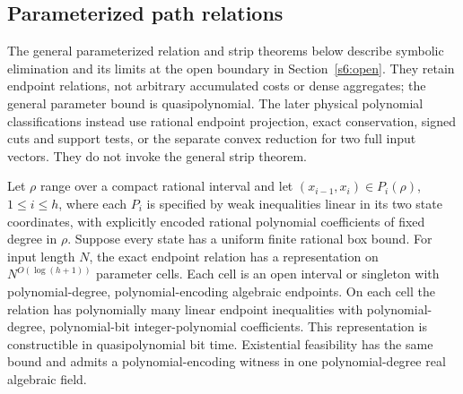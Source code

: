\subsection{Parameterized path relations}\label{s5:parameter-paths}

The general parameterized relation and strip theorems below describe
symbolic elimination and its limits at the open boundary in
Section~\ref{s6:open}. They retain endpoint relations, not arbitrary
accumulated costs or dense aggregates; the general parameter bound is
quasipolynomial. The later physical polynomial classifications instead
use rational endpoint projection, exact conservation, signed cuts and
support tests, or the separate convex reduction for two full input
vectors. They do not invoke the general strip theorem.

\begin{theorem}
\label{s5:quasipoly-path}
Let $\rho$ range over a compact rational interval and let
$(x_{i-1},x_i)\in P_i(\rho)$, $1\le i\le h$, where each $P_i$ is
specified by weak inequalities linear in its two state coordinates,
with explicitly encoded rational polynomial coefficients of fixed
degree in $\rho$. Suppose every state has a uniform finite rational
box bound. For input length $N$, the exact endpoint relation has a
representation on $N^{O(\log(h+1))}$ parameter cells. Each cell is an
open interval or singleton with polynomial-degree, polynomial-encoding
algebraic endpoints. On each cell the relation has polynomially many
linear endpoint inequalities with polynomial-degree, polynomial-bit
integer-polynomial coefficients. This representation is constructible
in quasipolynomial bit time. Existential feasibility has the same bound
and admits a polynomial-encoding witness in one polynomial-degree real
algebraic field.
\end{theorem}
